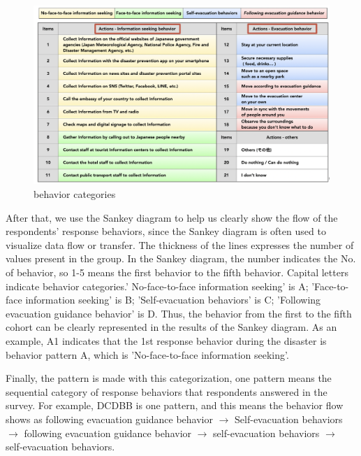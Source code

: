 \begin{figure}[h]
  \includegraphics[width=\linewidth]{Figure/Figure12.png}
  \centering
  \caption{behavior categories}
  \label{fig12}
\end{figure}

After that, we use the Sankey diagram to help us clearly show the flow of the respondents' response behaviors, since the Sankey diagram is often used to visualize data flow or transfer. The thickness of the lines expresses the number of values present in the group. In the Sankey diagram, the number indicates the No. of behavior, so 1-5 means the first behavior to the fifth behavior. Capital letters indicate behavior categories.' No-face-to-face information seeking' is A; 'Face-to-face information seeking' is B; 'Self-evacuation behaviors' is C; 'Following evacuation guidance behavior' is D. Thus, the behavior from the first to the fifth cohort can be clearly represented in the results of the Sankey diagram. As an example, A1 indicates that the 1st response behavior during the disaster is behavior pattern A, which is 'No-face-to-face information seeking'.

Finally, the pattern is made with this categorization, one pattern means the sequential category of response behaviors that respondents answered in the survey. For example, DCDBB is one pattern, and this means the behavior flow shows as following evacuation guidance behavior $\rightarrow$ Self-evacuation behaviors $\rightarrow$ following evacuation guidance behavior $\rightarrow$ self-evacuation behaviors $\rightarrow$ self-evacuation behaviors. 







